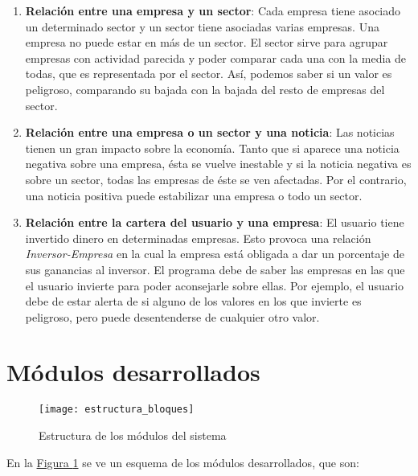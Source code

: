 \documentclass[11pt,openany]{book} %
\begin{document}
\begin{enumerate}[\qquad\color{ocre}{$\bullet$}]
    \item \textbf{\textcolor{ocre}{Relación entre una empresa y un sector}}: Cada empresa tiene asociado un determinado sector y un sector tiene asociadas varias empresas. Una empresa no puede estar en más de un sector. El sector sirve para agrupar empresas con actividad parecida y poder comparar cada una con la media de todas, que es representada por el sector. Así, podemos saber si un valor es peligroso, comparando su bajada con la bajada del resto de empresas del sector.

    \item \textbf{\textcolor{ocre}{Relación entre una empresa o un sector y una noticia}}: Las noticias tienen un gran impacto sobre la economía. Tanto que si aparece una noticia negativa sobre una empresa, ésta se vuelve inestable y si la noticia negativa es sobre un sector, todas las empresas de éste se ven afectadas. Por el contrario, una noticia positiva puede estabilizar una empresa o todo un sector.

    \item \textbf{\textcolor{ocre}{Relación entre la cartera del usuario y una empresa}}: El usuario tiene invertido dinero en determinadas empresas. Esto provoca una relación \textit{\textcolor{ocre}{Inversor-Empresa}} en la cual la empresa está obligada a dar un porcentaje de sus ganancias al inversor. El programa debe de saber las empresas en las que el usuario invierte para poder aconsejarle sobre ellas. Por ejemplo, el usuario debe de estar alerta de si alguno de los valores en los que invierte es peligroso, pero puede desentenderse de cualquier otro valor.
\end{enumerate}

\section{Módulos desarrollados}

\begin{figure}[!h]
    \centering
    \texttt{[image: estructura\_bloques]}
    \caption{Estructura de los módulos del sistema}
    \label{estructura}
\end{figure}

En la \hyperref[estructura]{Figura \ref*{estructura}} se ve un esquema de los módulos desarrollados, que son:
\end{document}
